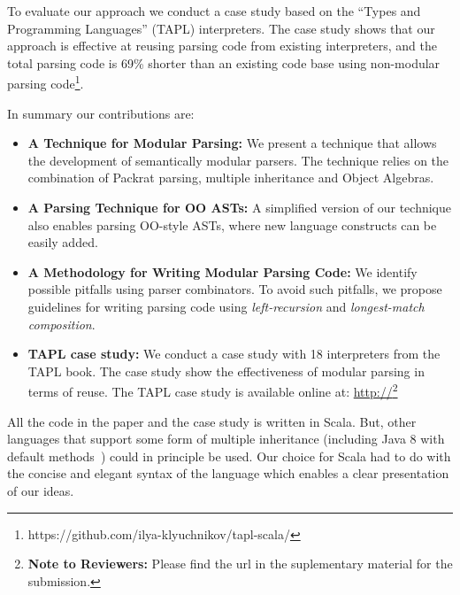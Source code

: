 \begin{comment}
  By analising the \emph{full} grammar it is possible to remove
  backtracking, which would otherwise increase parsing times. Many
  parsing combinator libraries routinely use backtracting elimination
  to achieve performance. However, in a modular setting this technique
  cannot be used, because the full grammar is not known. Thus we have
  to be very conservative at eliminating backtracting. Unfortunatelly,
  this has a severe impact on performance.
\end{comment}

To evaluate our approach we conduct a case study based on the ``Types
and Programming Languages'' (TAPL) interpreters. The case study shows
that our approach is effective at reusing parsing code from existing
interpreters, and the total parsing code is 69\% shorter than an
existing code base using non-modular parsing code\footnote{https://github.com/ilya-klyuchnikov/tapl-scala/}.

In summary our contributions are:

\begin{itemize}[noitemsep,nolistsep]

\item {{\bf A Technique for Modular Parsing:}} We present a technique
that allows the development of semantically modular parsers.
The technique relies on the combination of Packrat parsing, multiple inheritance
  and Object Algebras.

\item {{\bf A Parsing Technique for OO ASTs:}} A simplified version of
  our technique also enables parsing OO-style ASTs, where new language
  constructs can be easily added.

\item {{\bf A Methodology for Writing Modular Parsing Code:}} We
  identify possible pitfalls using parser combinators. To avoid such
  pitfalls, we propose guidelines for writing parsing code using
  \emph{left-recursion} and \emph{longest-match composition}.

\item {{\bf TAPL case study:}} We conduct a case study with 18 interpreters
  from the TAPL book. The case study show the effectiveness of modular
  parsing in terms of reuse. The TAPL case study is available online
  at:
  \url{http://}\footnote{{\bf Note to Reviewers:} Please find the url in the
  suplementary material for the submission.}

\end{itemize}

All the code in the paper and the case study is written in Scala. But,
other languages that support some form of multiple inheritance
(including Java 8 with default methods~\cite{Goetz2012}) could in principle be
used. Our choice for Scala had to do with the concise and elegant syntax
of the language which enables a clear presentation of our ideas.
